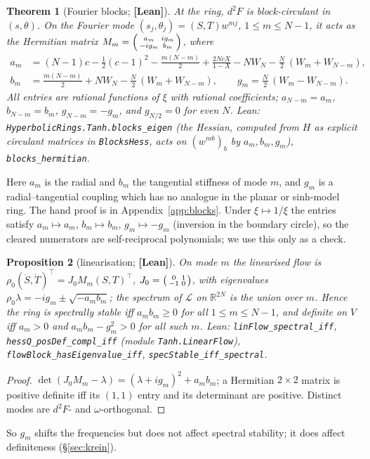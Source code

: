 \documentclass[11pt]{article}
\newtheorem{theorem}{Theorem}[section]
\newtheorem{proposition}[theorem]{Proposition}
\theoremstyle{definition}
\theoremstyle{remark}
\newcommand{\st}[1]{\textbf{[#1]}}
\newcommand{\lean}[1]{\nolinkurl{#1}}
\begin{document}
\begin{theorem}[Fourier blocks; \st{Lean}]\label{thm:blocks}
At the ring, $d^2F$ is block-circulant in $(s,\theta)$. On the Fourier mode $(s_j,\theta_j)=(S,T)w^{mj}$, $1\le m\le N-1$, it
acts as the Hermitian matrix $M_m=\begin{psmallmatrix}a_m&ig_m\\-ig_m&b_m\end{psmallmatrix}$, where
\begin{align*}
a_m&=(N-1)c-\tfrac12(c-1)^2-\tfrac{m(N-m)}2+\frac{2NcX}{1-X}-NW_N-\tfrac N2\,(W_m+W_{N-m}),\\
b_m&=\tfrac{m(N-m)}2+NW_N-\tfrac N2\,(W_m+W_{N-m}),\qquad g_m=\tfrac N2\,(W_m-W_{N-m}).
\end{align*}
All entries are rational functions of $\xi$ with rational coefficients; $a_{N-m}=a_m$, $b_{N-m}=b_m$, $g_{N-m}=-g_m$, and
$g_{N/2}=0$ for even $N$. Lean: \lean{HyperbolicRings.Tanh.blocks_eigen} (the Hessian, computed from $H$ as explicit
circulant matrices in \lean{BlocksHess}, acts on $(w^{mb})_b$ by $a_m,b_m,g_m$), \lean{blocks_hermitian}.
\end{theorem}
Here $a_m$ is the radial and $b_m$ the tangential stiffness of mode $m$, and $g_m$ is a radial--tangential coupling which has
no analogue in the planar or sinh-model ring. The hand proof is in Appendix~\ref{app:blocks}. Under $\xi\mapsto1/\xi$ the
entries satisfy $a_m\mapsto a_m$, $b_m\mapsto b_m$, $g_m\mapsto-g_m$ (inversion in the boundary circle), so the cleared
numerators are self-reciprocal polynomials; we use this only as a check.

\begin{proposition}[linearisation; \st{Lean}]\label{prop:lin}
On mode $m$ the linearised flow is $\rho_0(\dot S,\dot T)^{\top}=J_0M_m(S,T)^{\top}$, $J_0=\begin{psmallmatrix}0&1\\-1&0\end{psmallmatrix}$, with
eigenvalues $\rho_0\lambda=-ig_m\pm\sqrt{-a_mb_m}$; the spectrum of $\mathcal L$ on $\mathbb R^{2N}$ is the union over $m$. Hence the
ring is spectrally stable iff $a_mb_m\ge0$ for all $1\le m\le N-1$, and definite on $V$ iff $a_m>0$ and $a_mb_m-g_m^2>0$ for all
such $m$. Lean: \lean{linFlow_spectral_iff}, \lean{hessQ_posDef_compl_iff} (module \lean{Tanh.LinearFlow}), \lean{flowBlock_hasEigenvalue_iff},
\lean{specStable_iff_spectral}.
\end{proposition}
\begin{proof}
$\det(J_0M_m-\lambda)=(\lambda+ig_m)^2+a_mb_m$; a Hermitian $2\times2$ matrix is positive definite iff its $(1,1)$ entry and its
determinant are positive. Distinct modes are $d^2F$- and $\omega$-orthogonal.
\end{proof}
So $g_m$ shifts the frequencies but does not affect spectral stability; it does affect definiteness (\S\ref{sec:krein}).
\end{document}

